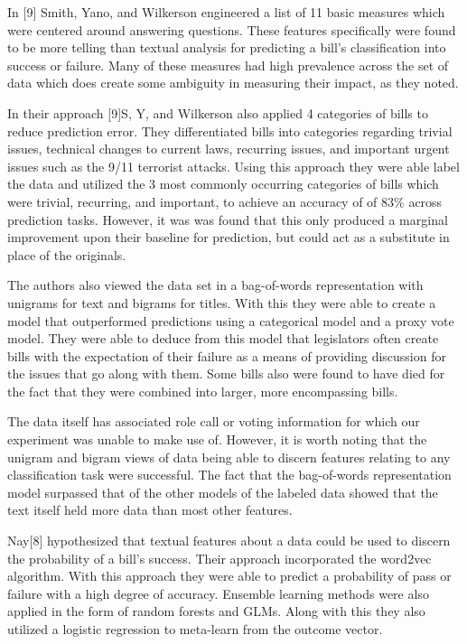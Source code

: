 \documentclass[11pt,a4paper]{article}
\begin{document}
In [9] Smith, Yano, and Wilkerson engineered a list of 11 basic measures which were centered around answering questions. These features specifically were found to be more telling than textual analysis for predicting a bill's classification into success or failure. Many of these measures had high prevalence across the set of data which does create some ambiguity in measuring their impact, as they noted.

In their approach [9]S, Y, and Wilkerson also applied 4 categories of bills to reduce prediction error. They differentiated bills into categories regarding trivial issues, technical changes to current laws, recurring issues, and important urgent issues such as the 9/11 terrorist attacks. Using this approach they were able label the data and utilized the 3 most commonly occurring categories of bills which were trivial, recurring, and important, to achieve an accuracy of of 83\% across prediction tasks. However, it was was found that this only produced a marginal improvement upon their baseline for prediction, but could act as a substitute in place of the originals.

The authors also viewed the data set in a bag-of-words representation with unigrams for text and bigrams for titles. With this they were able to create a model that outperformed predictions using a categorical model and a proxy vote model. They were able to deduce from this model that legislators often create bills with the expectation of their failure as a means of providing discussion for the issues that go along with them. Some bills also were found to have died for the fact that they were combined into larger, more encompassing bills.

The data itself has associated role call or voting information for which our experiment was unable to make use of. However, it is worth noting that the unigram and bigram views of data being able to discern features relating to any classification task were successful. The fact that the bag-of-words representation model surpassed that of the other models of the labeled data showed that the text itself held more data than most other features.

Nay[8] hypothesized that textual features about a data could be used to discern the probability of a bill's success. Their approach incorporated the word2vec algorithm. With this approach they were able to predict a probability of pass or failure with a high degree of accuracy. Ensemble learning methods were also applied in the form of random forests and GLMs. Along with this they also utilized a logistic regression to meta-learn from the outcome vector.
\end{document}
